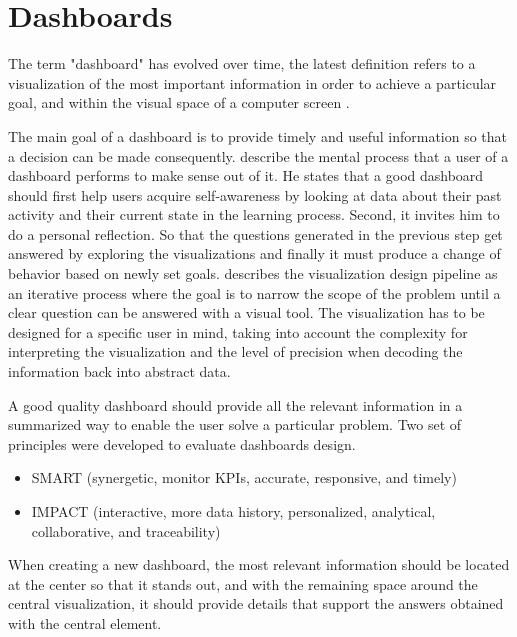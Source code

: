 \chapter{Dashboards}

The term "dashboard" has evolved over time, the latest definition refers to a visualization of the most important information in order to achieve a particular goal, and within the visual space of a computer screen \cite{Park2015}.

The main goal of a dashboard is to provide timely and useful information so that a decision can be made consequently. \citeauthor{Verbert2013} describe the mental process that a user of a dashboard performs to make sense out of it. He states that a good dashboard should first help users acquire self-awareness by looking at data about their past activity and their current state in the learning process. Second, it invites him to do a personal reflection. So that the questions generated in the previous step get answered by exploring the visualizations and finally it must produce a change of behavior based on newly set goals. \citeauthor{Telea2017} describes the visualization design pipeline as an iterative process where the goal is to narrow the scope of the problem until a clear question can be answered with a visual tool. The visualization has to be designed for a specific user in mind, taking into account the complexity for interpreting the visualization and the level of precision when decoding the information back into abstract data.

A good quality dashboard should provide all the relevant information in a summarized way to enable the user solve a particular problem. Two set of principles were developed to evaluate dashboards design. 
\begin{itemize}
	\item SMART (synergetic, monitor KPIs, accurate, responsive,
	and timely)
	\item IMPACT (interactive, more data history, personalized, analytical, collaborative, and traceability) \cite{Malik2005}\\
	
\end{itemize}

When creating a new dashboard, the most relevant information should be located at the center so that it stands out, and with the remaining space around the central visualization, it should provide details that support the answers obtained with the central element.

